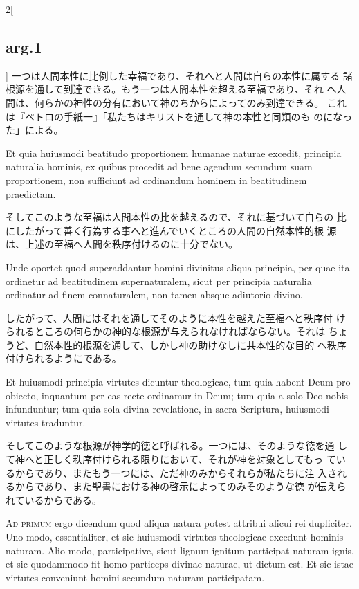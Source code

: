 \documentclass[paper=a4paper,fontsize=10pt,jafontsize=9pt,titlepage]{jlreq}
\begin{document}
\begin{paracol}{2}[\subsection{arg.1}]
一つは人間本性に比例した幸福であり、それへと人間は自らの本性に属する
 諸根源を通して到達できる。もう一つは人間本性を超える至福であり、それ
 へ人間は、何らかの神性の分有において神のちからによってのみ到達できる。
 これは『ペトロの手紙一』「私たちはキリストを通して神の本性と同類のも
 のになった」による。

\switchcolumn*

Et quia huiusmodi beatitudo proportionem humanae naturae excedit,
principia naturalia hominis, ex quibus procedit ad bene agendum
secundum suam proportionem, non sufficiunt ad ordinandum hominem in
beatitudinem praedictam.

\switchcolumn

そしてこのような至福は人間本性の比を越えるので、それに基づいて自らの
 比にしたがって善く行為する事へと進んでいくところの人間の自然本性的根
 源は、上述の至福へ人間を秩序付けるのに十分でない。

\switchcolumn*

Unde oportet quod superaddantur homini divinitus aliqua principia,
per quae ita ordinetur ad beatitudinem supernaturalem, sicut per
principia naturalia ordinatur ad finem connaturalem, non tamen absque
adiutorio divino.

\switchcolumn

したがって、人間にはそれを通してそのように本性を越えた至福へと秩序付
 けられるところの何らかの神的な根源が与えられなければならない。それは
 ちょうど、自然本性的根源を通して、しかし神の助けなしに共本性的な目的
 へ秩序付けられるようにである。

\switchcolumn*

Et huiusmodi principia virtutes dicuntur theologicae, tum quia habent
Deum pro obiecto, inquantum per eas recte ordinamur in Deum; tum quia
a solo Deo nobis infunduntur; tum quia sola divina revelatione, in
sacra Scriptura, huiusmodi virtutes traduntur.

\switchcolumn

そしてこのような根源が神学的徳と呼ばれる。一つには、そのような徳を通
 して神へと正しく秩序付けられる限りにおいて、それが神を対象としてもっ
 ているからであり、またもう一つには、ただ神のみからそれらが私たちに注
 入されるからであり、また聖書における神の啓示によってのみそのような徳
 が伝えられているからである。

\switchcolumn*[\subsection{ad.1}]

{\scshape Ad primum} ergo dicendum quod aliqua natura potest attribui
alicui rei dupliciter. Uno modo, essentialiter, et sic huiusmodi
virtutes theologicae excedunt hominis naturam. Alio modo,
participative, sicut lignum ignitum participat naturam ignis, et sic
quodammodo fit homo particeps divinae naturae, ut dictum est. Et sic
istae virtutes conveniunt homini secundum naturam participatam.


\end{paracol}
\end{document}
